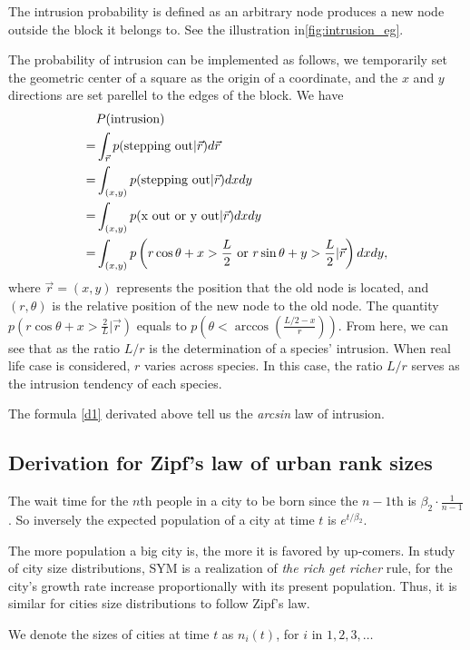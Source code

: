 \documentclass[aps,prl]{revtex4-2}
\begin{document}
The intrusion probability is defined as an arbitrary node produces a new node outside the block it belongs to. See the illustration in\@\ref{fig:intrusion_eg}.



The probability of intrusion can be implemented as follows, we temporarily set the geometric center of a square as the origin of a coordinate, and the $x$ and $y$ directions are set parellel to the edges of the block. We have 
\begin{align}
&P(\text{intrusion}) \\=& \int_{\vec{r}} p(\text{stepping out}|\vec{r})d\vec{r}\label{d1}\\
=& \int_{(x,y)} p(\text{stepping out}|\vec{r})dxdy    \notag \\
=& \int_{(x,y)}p(\text{x out or y out}|\vec{r})dxdy\notag
\\
=& \int_{(x,y)}p\left(r\cos\theta+x>\frac{L}{2}\text{ or }r\sin\theta+y>\frac{L}{2}|\vec{r}\right)dxdy,
\end{align}
where $\vec{r}=(x,y)$ represents the position that the old node is located, and $(r,\theta)$ is the relative position of the new node to the old node. The quantity $p\left(r\cos\theta+x>\frac{2}{L}|\vec{r}\right)$ equals to $p\left(\theta<\arccos\left(\frac{L/2-x}{r}\right)\right)$. From here, we can see that as the ratio $L/r$ is the determination of a species' intrusion. When  real life case is considered, $r$ varies across species. In this case, the ratio $L/r$ serves as the intrusion tendency of each species. 

The formula \@\ref{d1} derivated above tell us the \emph{arcsin} law of intrusion.

\subsection{Derivation for Zipf's law of urban rank sizes}

The wait time for the $n$th people in a city to be born since the $n-1$th is $\beta_2 \cdot \frac{1}{n-1}$. So inversely the expected population of a city at time $t$ is $e^{t/\beta_2}$. 

The more population a big city is, the more it is favored by up-comers. In study of city size distributions, SYM is a realization of \emph{the rich get richer} rule, for the city's growth rate increase proportionally with its present population. Thus, it is similar for cities size distributions to follow Zipf's law. 

We denote the sizes of cities at time $t$ as $n_i(t)$, for $i$ in $1,2,3,\dots$
\end{document}
